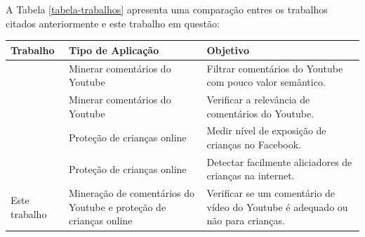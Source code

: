 A Tabela \ref{tabela-trabalhos} apresenta uma comparação entres os trabalhos citados anteriormente e este trabalho em questão:


\begin{table}[H]
	{%
		\begin{tabular}{p{4cm}p{5cm}p{6cm}} %
			\toprule
			Trabalho & Tipo de Aplicação &  Objetivo \\
			\midrule \midrule
    		\cite{ammari2011filteringYt} & Minerar comentários do Youtube & Filtrar comentários do Youtube com pouco valor semântico.\\
    		\hline	
			\cite{schultes2013leave} & Minerar comentários do Youtube & Verificar a relevância de comentários do Youtube.\\
			\hline
			\cite{marioFalcao2016} & Proteção de crianças online & Medir nível de exposição de crianças no Facebook.\\
			\hline
			\cite{EnyoGoncalves2017} & Proteção de crianças online & Detectar facilmente aliciadores de crianças na internet.\\
			\hline
			Este trabalho & Mineração de comentários do Youtube e proteção de crianças online & Verificar se um comentário de vídeo do Youtube é adequado ou não para crianças.\\
			\bottomrule
		\end{tabular}%
	}{%
}
\end{table}


